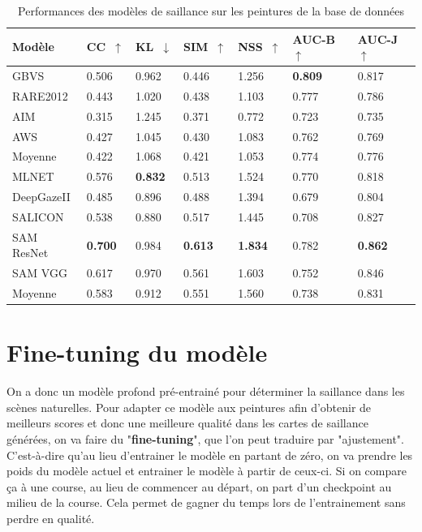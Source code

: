 \begin{table}[ht]
    \centering
        \begin{tabular}{|l|l|l|l|l|l|l|}
		\hline
        Modèle & CC~$\uparrow$ & KL~$\downarrow$ & SIM~$\uparrow$ & NSS~$\uparrow$ & AUC-B~$\uparrow$ & AUC-J~$\uparrow$\\
		\hline
        GBVS \cite{GBVS}        & 0.506 & 0.962 & 0.446 & 1.256 & \textbf{0.809} & 0.817\\
        RARE2012 \cite{RARE2012}    & 0.443 & 1.020 & 0.438 & 1.103 & 0.777 & 0.786\\
        AIM \cite{AIM}         & 0.315 & 1.245 & 0.371 & 0.772 & 0.723 & 0.735\\
        AWS \cite{AWS}         & 0.427 & 1.045 & 0.430 & 1.083 & 0.762 & 0.769\\
		\hline
        Moyenne     & 0.422 & 1.068 & 0.421 & 1.053 & 0.774 & 0.776\\
		\hline
        MLNET \cite{MLNET}       & 0.576 & \textbf{0.832} & 0.513 & 1.524 & 0.770 & 0.818\\
        DeepGazeII \cite{deepGazeII}  & 0.485 & 0.896 & 0.488 & 1.394 & 0.679 & 0.804\\
        SALICON \cite{SALICON}     & 0.538 & 0.880 & 0.517 & 1.445 & 0.708 & 0.827\\
        SAM ResNet \cite{SAM}  & \textbf{0.700} & 0.984 & \textbf{0.613} & \textbf{1.834} & 0.782 & \textbf{0.862}\\
        SAM VGG \cite{SAM}     & 0.617 & 0.970 & 0.561 & 1.603 & 0.752 & 0.846\\
		\hline
        Moyenne     & 0.583 & 0.912 & 0.551 & 1.560 & 0.738 & 0.831\\
		\hline
        \end{tabular}
    \caption{Performances des modèles de saillance sur les peintures de la base de données}
    \label{tab:scores}
\end{table}

\vfill

\newpage
\section{Fine-tuning du modèle}

\par
On a donc un modèle profond pré-entrainé pour déterminer la saillance dans les scènes naturelles. Pour adapter ce modèle aux peintures afin d'obtenir de meilleurs scores et donc une meilleure qualité dans les cartes de saillance générées, on va faire du "\textbf{fine-tuning}", que l'on peut traduire par "ajustement". C'est-à-dire qu'au lieu d'entrainer le modèle en partant de zéro, on va prendre les poids du modèle actuel et entrainer le modèle à partir de ceux-ci. Si on compare ça à une course, au lieu de commencer au départ, on part d'un checkpoint au milieu de la course. Cela permet de gagner du temps lors de l'entrainement sans perdre en qualité.

